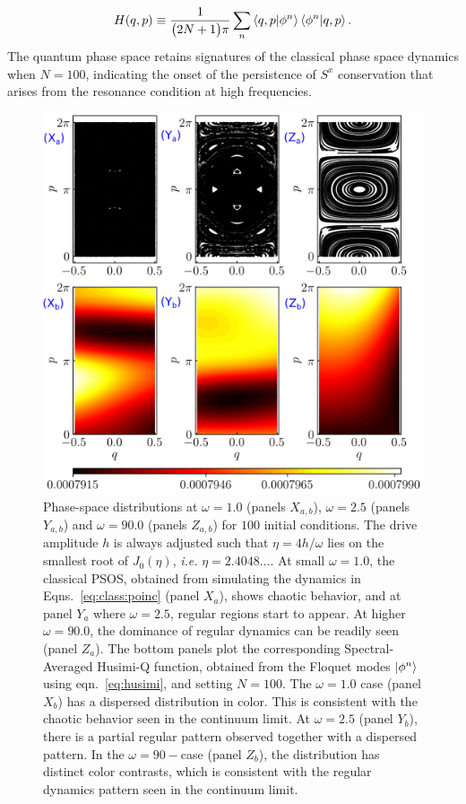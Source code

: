 \documentclass[%
reprint,
superscriptaddress,
amsmath,amssymb,
aps,
prb,
showkeys,
]{revtex4-2}
\begin{document}
\begin{equation}
	H(q,p)\equiv \frac{1}{\big(2N+1\big)\pi}\sum_n \ip{q,p}{\phi^n}\ip{\phi^n}{q,p}.
	\label{eq:husimi}
\end{equation}
The quantum phase space retains signatures of the classical phase space dynamics when $N=100$, indicating the onset of the persistence of $S^x$ conservation that arises from the resonance condition at high frequencies. 
\begin{figure}[t!]
	\centering
	\includegraphics[width = 9.0 cm]{lmg_poincare0111.jpeg}
	\caption{Phase-space distributions at $\omega=1.0$ (panels $X_{a,b}$), $\omega=2.5$ (panels $Y_{a,b}$) and $\omega=90.0$ (panels $Z_{a,b}$) for $100$ initial conditions. The drive amplitude $h$ is always adjusted such that $\eta=4h/\omega$ lies on the smallest root of $J_0(\eta)$, \textit{i.e.} $\eta=2.4048\dots$. At small $\omega=1.0$, the classical PSOS, obtained from simulating the dynamics in Eqns.~\ref{eq:class:poinc} (panel $X_{a}$),  shows chaotic behavior, and at panel $Y_{a}$ where $\omega = 2.5$, regular regions start to appear. At higher $\omega = 90.0$, the dominance of regular dynamics can be readily seen (panel $Z_{a}$). The bottom panels plot the corresponding Spectral-Averaged Husimi-Q function, obtained from the Floquet modes $\ket{\phi^n}$ using eqn.~\ref{eq:husimi}, and setting $N=100$. The $\omega=1.0$ case (panel $X_{b}$) has a dispersed distribution in color. This is consistent with the chaotic behavior seen in the continuum limit. At $\omega = 2.5$ (panel $Y_{b}$), there is a partial regular pattern observed together with a dispersed pattern. In the $\omega=90-$case (panel $Z_{b}$), the distribution has distinct color contrasts, which is consistent with the regular dynamics pattern seen in the continuum limit.}
	\label{fig:classical_lipkin}
\end{figure}
\end{document}
